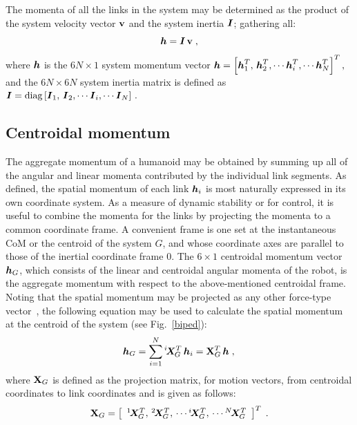 \documentclass{llncs}
\newcommand{\bA}{\mbox{\boldmath $A$}}
\newcommand{\bI}{\mbox{\boldmath $I$}}
\newcommand{\bh}{\mbox{\boldmath $h$}}
\newcommand{\bq}{\mbox{\boldmath $q$}}
\newcommand{\vI}{\vec{I}}
\newcommand{\diag}{{\rm diag}}
\newcommand{\bqd}{\dot{\bq}}
\newcommand{\bv}{{\bf v}}
\newcommand{\vX}{\vec{X}}
\newcommand{\bX}{{\bf X}}
\newcommand{\XM}[2]{{}^{#1}\!\vX_{\!#2}}
\begin{document}
The momenta of all the links in the system may be determined as the
product of the system velocity vector $\bv$ and the system inertia
$\bI$; gathering all:
%
\begin{equation}
\label{eq:h}
\bh = \bI \, \bv \; ,
\end{equation}
%
where $\bh$ is the $6N\times 1$ system momentum vector $\bh = \left[ \bh_1^T, \, \bh_2^T, \cdots \bh_i^T, \cdots \bh_N^T \right]^T,$
and the $6N \times 6N$ system inertia matrix is defined as
$\bI = \diag \left[ \vI_1, \, \vI_2, \cdots \vI_i, \cdots \vI_N \right] \, .$
%



\subsection{Centroidal momentum}

The aggregate momentum of a humanoid may be obtained by summing up all of the angular and linear momenta contributed by the individual link segments. 
As defined, the spatial momentum of each link $\bh_i$ is most
naturally expressed in its own coordinate system.  As a measure of
dynamic stability or for control, it is useful to combine the
momenta for the links by projecting the momenta to a common
coordinate frame.  A convenient frame is one set at the
instantaneous CoM or the centroid of the system
$G$, and whose coordinate axes are parallel to those of the inertial coordinate frame 0.
The $6\times 1$ centroidal momentum vector $\bh_G$, which
consists of the linear and centroidal angular momenta of the robot, is the aggregate momentum with respect to the above-mentioned centroidal frame.
Noting that the spatial momentum may be projected as any other
force-type vector~\cite{FeOr08}, the following equation may be used to calculate
the spatial momentum at the centroid of the system (see Fig.~\ref{biped}):
%
\begin{equation}\label{hgt}
\bh_G = \sum_{i=1}^N  \XM{i}{G}^T \, \bh_i = \bX_G^T \, \bh \; ,\\%
\end{equation}
%
%
where $\bX_G$ is defined as the projection matrix, for motion vectors,
from centroidal coordinates to link coordinates and is given as follows:
%
\begin{equation}
\bX_G = \left[ \begin{array}{c} \XM{1}{G}^T, \, \XM{2}{G}^T, \,
\cdots \XM{i}{G}^T, \, \cdots \XM{N}{G}^T \end{array} \right]^T \; .
\end{equation}
%
\end{document}
